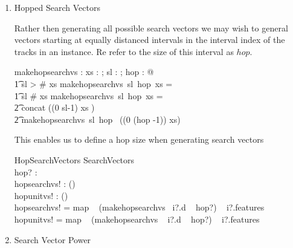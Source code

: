 \documentclass[11pt]{article}
\begin{document}
\begin{enumerate}
\begin{schema}{SearchVectors}
	i? : Instance \\
	sl? : \nat \\
	searchvs! :  \seq (\seq \Vdsl) \\  
	unitvs! :  \seq (\seq \Vsl) \\  
\where
	searchvs! =   map ~ (makesearchvs ~ sl?) ~ i?.features  \\
	unitvs! =  map ~ (makesearchvs ~ sl?) ~ i?.features  \\
\end{schema}

\item \textsf{Hopped Search Vectors}

Rather then generating all possible search vectors we may wish to general vectors starting at equally distanced intervals in the interval index of the tracks in an instance.  Re refer to the size of this interval as $hop$. 

\begin{axdef}
 	makehopsearchvs : \nat \fun  \nat \fun \seq \Vd \fun \seq \Vdsl
\where 
	\forall xs :  \seq \FV ; sl : \nat  ; hop  : \nat  @ \\
\t1 sl > \# xs \implies makehopsearchvs~sl~hop~xs = \langle \rangle  \land \\
\t1 sl \leq \# xs \implies makehopsearchvs~sl~hop~xs = \\
\t2 concat (\langle (0 \upto sl-1) \dres xs  \rangle)  \cat  \\
\t2 			makehopsearchvs~sl~hop~ ((0 \upto (hop -1)) \ndres xs)
\end{axdef}

This enables us to define a hop size when generating  search vectors

\begin{schema}{HopSearchVectors}
	SearchVectors \\
	hop? : \nat \\
	hopsearchvs! :  \seq (\seq \Vdsl) \\  
	hopunitvs! :  \seq (\seq \Vsl) \\  
\where
	hopsearchvs! =  map ~ (makehopsearchvs ~i?.d ~ hop?) ~ i?.features  \\
	hopunitvs! =  map ~ (makehopsearchvs ~ i?.d ~ hop?) ~ i?.features  \\
\end{schema}

\item \textsf{Search Vector Power}


\end{enumerate}
\end{document}
